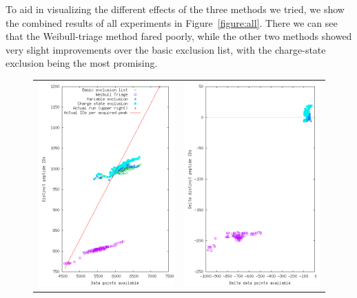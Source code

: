 \documentclass[12pt,twoside,openright]{report}
\begin{document}
To aid in visualizing the different effects of the three methods we tried, we
show the combined results of all experiments in Figure~\ref{figure:all}. There
we can see that the Weibull-triage method fared poorly, while the other two
methods showed very slight improvements over the basic exclusion list, with the
charge-state exclusion being the most promising.

\begin{figure}
\centering
\begin{tabular}{cc}
\includegraphics[width=3.0in]{5_all2.png} &
\includegraphics[width=3.0in]{5b_all2.png} \\

\end{tabular}
\end{figure}
\end{document}
